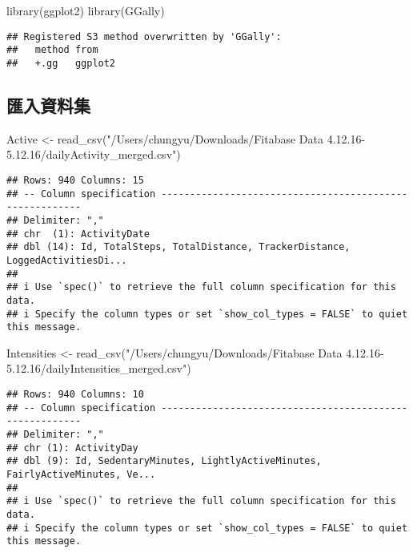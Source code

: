 \documentclass[
]{article}
\newenvironment{Shaded}{\begin{snugshade}}{\end{snugshade}}
\newcommand{\FunctionTok}[1]{\textcolor[rgb]{0.00,0.00,0.00}{#1}}
\newcommand{\NormalTok}[1]{#1}
\newcommand{\OtherTok}[1]{\textcolor[rgb]{0.56,0.35,0.01}{#1}}
\newcommand{\StringTok}[1]{\textcolor[rgb]{0.31,0.60,0.02}{#1}}
\begin{document}
\begin{Shaded}
\begin{Highlighting}[]
\FunctionTok{library}\NormalTok{(ggplot2)}
\FunctionTok{library}\NormalTok{(GGally)}
\end{Highlighting}
\end{Shaded}

\begin{verbatim}
## Registered S3 method overwritten by 'GGally':
##   method from   
##   +.gg   ggplot2
\end{verbatim}

\hypertarget{ux532fux5165ux8cc7ux6599ux96c6}{%
\subsection{匯入資料集}\label{ux532fux5165ux8cc7ux6599ux96c6}}

\begin{Shaded}
\begin{Highlighting}[]
\NormalTok{Active }\OtherTok{\textless{}{-}} \FunctionTok{read\_csv}\NormalTok{(}\StringTok{"/Users/chungyu/Downloads/Fitabase Data 4.12.16{-}5.12.16/dailyActivity\_merged.csv"}\NormalTok{)}
\end{Highlighting}
\end{Shaded}

\begin{verbatim}
## Rows: 940 Columns: 15
## -- Column specification --------------------------------------------------------
## Delimiter: ","
## chr  (1): ActivityDate
## dbl (14): Id, TotalSteps, TotalDistance, TrackerDistance, LoggedActivitiesDi...
## 
## i Use `spec()` to retrieve the full column specification for this data.
## i Specify the column types or set `show_col_types = FALSE` to quiet this message.
\end{verbatim}

\begin{Shaded}
\begin{Highlighting}[]
\NormalTok{Intensities }\OtherTok{\textless{}{-}} \FunctionTok{read\_csv}\NormalTok{(}\StringTok{"/Users/chungyu/Downloads/Fitabase Data 4.12.16{-}5.12.16/dailyIntensities\_merged.csv"}\NormalTok{)}
\end{Highlighting}
\end{Shaded}

\begin{verbatim}
## Rows: 940 Columns: 10
## -- Column specification --------------------------------------------------------
## Delimiter: ","
## chr (1): ActivityDay
## dbl (9): Id, SedentaryMinutes, LightlyActiveMinutes, FairlyActiveMinutes, Ve...
## 
## i Use `spec()` to retrieve the full column specification for this data.
## i Specify the column types or set `show_col_types = FALSE` to quiet this message.
\end{verbatim}
\end{document}
